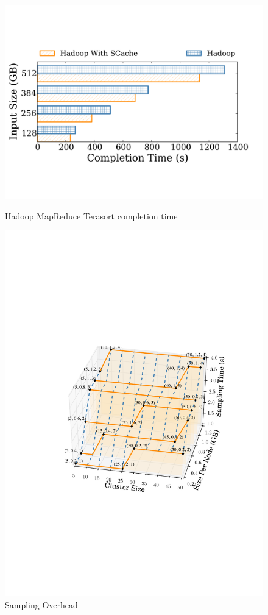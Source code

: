 \begin{figure}
    \centering
    \begin{minipage}{0.4\textwidth}
        \centering
        \includegraphics[width=\textwidth]{fig/hadoop_terasort_time} %
        \caption{\color{blue}Hadoop MapReduce Terasort completion time}
		\label{fig:hadoop_terasort_time}
    \end{minipage}\hfill
    \begin{minipage}{0.4\textwidth}
        \centering
        \includegraphics[width=\textwidth]{fig/sampling} %
        \caption{Sampling Overhead}
		\label{fig:sampling}
    \end{minipage}
\end{figure}